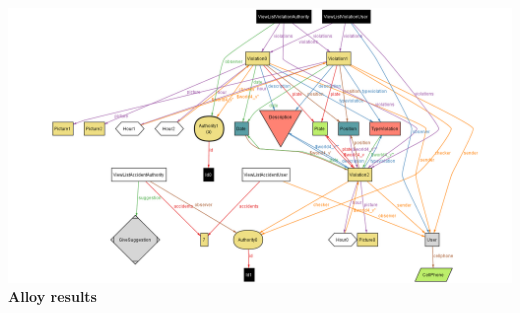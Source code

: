 \newpage

\includegraphics[width=\textwidth]{Images/AlloyWorlds/World4.png}
\newpage
\textbf{\LARGE Alloy results \\}
